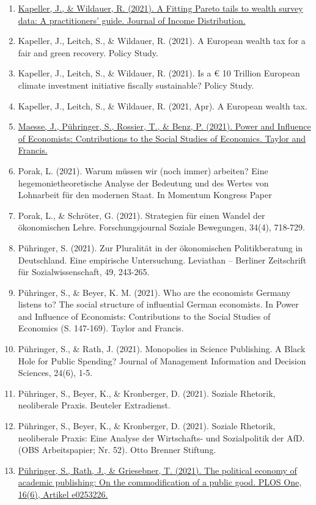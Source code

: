 \begin{enumerate}
	 \item \href{https://doi.org/10.25071/1874-6322.40447}{Kapeller, J., \& Wildauer, R. (2021). A Fitting Pareto tails to wealth survey data: A practitioners’ guide. Journal of Income Distribution.}
	 \item Kapeller, J., Leitch, S., \& Wildauer, R. (2021). A European wealth tax for a fair and green recovery. Policy Study.
	 \item Kapeller, J., Leitch, S., \& Wildauer, R. (2021). Is a € 10 Trillion European climate investment initiative fiscally sustainable? Policy Study.
	 \item Kapeller, J., Leitch, S., \& Wildauer, R. (2021, Apr). A European wealth tax.
	 \item \href{https://doi.org/10.4324/9780367817084}{Maesse, J., Pühringer, S., Rossier, T., \& Benz, P. (2021). Power and Influence of Economists: Contributions to the Social Studies of Economics. Taylor and Francis.}
	 \item Porak, L. (2021). Warum müssen wir (noch immer) arbeiten? Eine hegemonietheoretische Analyse der Bedeutung und des Wertes von Lohnarbeit für den modernen Staat. In Momentum Kongress Paper
	 \item Porak, L., \& Schröter, G. (2021). Strategien für einen Wandel der ökonomischen Lehre. Forschungsjournal Soziale Bewegungen, 34(4), 718-729.
	 \item Pühringer, S. (2021). Zur Pluralität in der ökonomischen Politikberatung in Deutschland. Eine empirische Untersuchung. Leviathan -- Berliner Zeitschrift für Sozialwissenschaft, 49, 243-265.
	 \item Pühringer, S., \& Beyer, K. M. (2021). Who are the economists Germany listens to? The social structure of influential German economists. In Power and Influence of Economists: Contributions to the Social Studies of Economics (S. 147-169). Taylor and Francis.
	 \item Pühringer, S., \& Rath, J. (2021). Monopolies in Science Publishing. A Black Hole for Public Spending? Journal of Management Information and Decision Sciences, 24(6), 1-5.
	 \item Pühringer, S., Beyer, K., \& Kronberger, D. (2021). Soziale Rhetorik, neoliberale Praxis. Beuteler Extradienst.
	 \item Pühringer, S., Beyer, K., \& Kronberger, D. (2021). Soziale Rhetorik, neoliberale Praxis: Eine Analyse der Wirtschafts- und Sozialpolitik der AfD. (OBS Arbeitspapier; Nr. 52). Otto Brenner Stiftung.
	 \item \href{https://doi.org/10.1371/journal.pone.0253226}{Pühringer, S., Rath, J., \& Griesebner, T. (2021). The political economy of academic publishing: On the commodification of a public good. PLOS One, 16(6), Artikel e0253226.}

\end{enumerate}
